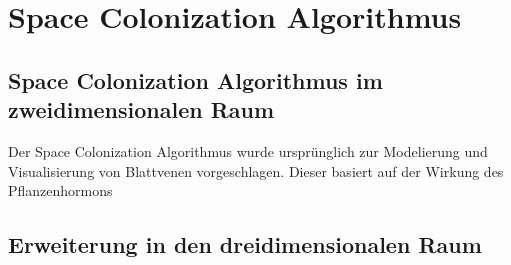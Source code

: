 \chapter{Space Colonization Algorithmus}

\section{Space Colonization Algorithmus im zweidimensionalen Raum}

Der Space Colonization Algorithmus wurde ursprünglich zur Modelierung und Visualisierung von Blattvenen vorgeschlagen. Dieser basiert auf der Wirkung des Pflanzenhormons 


\section{Erweiterung in den dreidimensionalen Raum}

